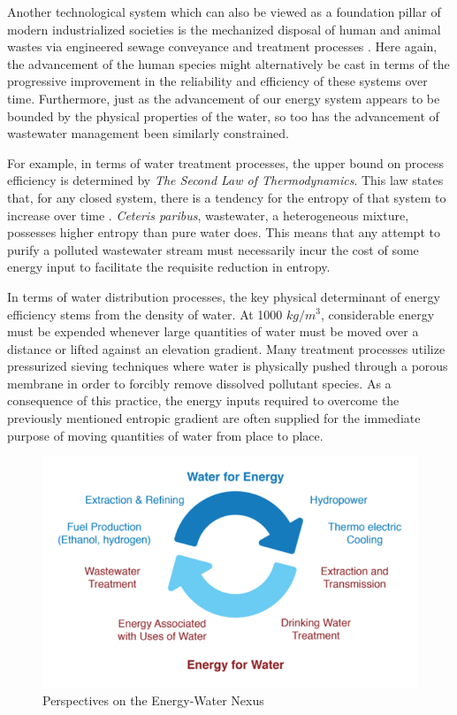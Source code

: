 Another technological system which can also be viewed as a foundation pillar of modern industrialized societies is the mechanized disposal of human and animal wastes via engineered sewage conveyance and treatment processes \cite{Angelakis2014}. Here again, the advancement of the human species might alternatively be cast in terms of the progressive improvement in the reliability and efficiency of these systems over time. Furthermore, just as the advancement of our energy system appears to be bounded by the physical properties of the water, so too has the advancement of wastewater management been similarly constrained. 
        
For example, in terms of water treatment processes, the upper bound on process efficiency is determined by \textit{The Second Law of Thermodynamics}. This law states that, for any closed system, there is a tendency for the entropy of that system to increase over time \cite{Jaynes1996}. \textit{Ceteris paribus}, wastewater, a heterogeneous mixture, possesses higher entropy than pure water does. This means that any attempt to purify a polluted wastewater stream must necessarily incur the cost of some energy input to facilitate the requisite reduction in entropy. 
    
In terms of water distribution processes, the key physical determinant of energy efficiency stems from the density of water. At 1000 $kg/m^3$, considerable energy must be expended whenever large quantities of water must be moved over a distance or lifted against an elevation gradient. Many treatment processes utilize pressurized sieving techniques where water is physically pushed through a porous membrane in order to forcibly remove dissolved pollutant species. As a consequence of this practice, the energy inputs required to overcome the previously mentioned entropic gradient are often supplied for the immediate purpose of moving quantities of water from place to place.
    
     \begin{figure}[!h]
       \centering
       \includegraphics[width=4.5in]{figures/energy-water-nexus-perspectives.png}
       \caption[Perspectives on the Energy-Water Nexus]{Perspectives on the Energy-Water Nexus \cite{Pate2007}}
       \label{fig:energy-water-perspectives}
     \end{figure}
     
